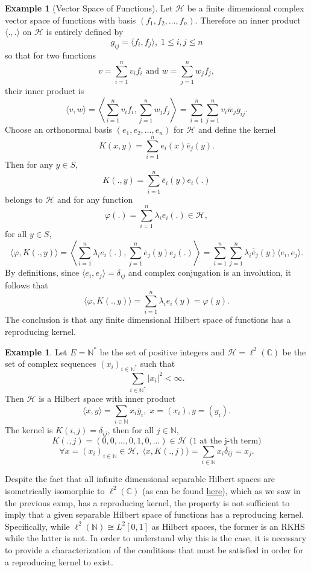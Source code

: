 \documentclass{article}
\theoremstyle{definition}
\newtheorem{exmp}[thm]{Example}
\theoremstyle{remark}
\numberwithin{equation}{section}
\begin{document}
\begin{exmp}[Vector Space of Functions]
Let $\mathcal{H}$ be a finite dimensional complex vector space of functions with basis $(f_1, f_2, \dots , f_n).$ Therefore an inner product $\langle . , . \rangle$ on $\mathcal{H}$ is entirely defined by 
$$ g_{ij} = \langle f_i, f_j \rangle, \; 1 \leq i, j \leq n$$
so that for two functions 
$$v = \sum _{i =1} ^n v_i f_i \text{ and } w = \sum ^n _{j = 1} w_j f_j, $$
their inner product is 
$$\langle v, w \rangle = \left\langle \sum _{i =1} ^n v_i f_i , \sum ^n _{j = 1} w_j f_j \right\rangle = \sum _{i = 1} ^n \sum _{j = 1} ^n v_i \overline{w}_j g_{ij}.$$
Choose an orthonormal basis $(e_1, e_2, \dots , e_n)$ for $\mathcal{H}$ and define the kernel 
$$K(x,y) = \sum _{i =1} ^n e_i (x) \overline{e} _j (y). $$
Then for any $y \in S$, 
$$K(. , y) = \sum ^n _{i = 1} \overline{e} _i (y) e_i (.)$$
belongs to $\mathcal{H}$ and for any function 
$$\varphi (.) = \sum ^n _{i = 1} \lambda _i e_i (.) \in \mathcal{H}, $$
for all $y \in S$, 
$$\langle \varphi , K(., y) \rangle = \left\langle \sum ^n _{i =1} \lambda_i e_i (.), \sum _{j=1} ^n \overline{e}_j (y) e_j (.) \right\rangle = \sum ^n _{i = 1} \sum ^n _{j = 1} \lambda _i \overline{\overline{e}}_j (y) \langle e_i, e_j \rangle.$$
By definitions, since $\langle e_i, e_j \rangle = \delta _{ij}$ and complex conjugation is an involution, it follows that 
$$\langle \varphi , K(., y) \rangle =  \sum _{i = 1} ^n \lambda _i e_i (y) = \varphi (y). $$
The conclusion is that any finite dimensional Hilbert space of functions has a reproducing kernel. 
\end{exmp}

\begin{exmp}
Let $E = \mathbb{N}^*$ be the set of positive integers and $\mathcal{H} = \ell ^2 (\mathbb{C})$ be the set of complex sequences $(x_i) _{i \in \mathbb{N}^*}$ such that 
$$\sum _{i \in \mathbb{N}^*} | x_i | ^2 < \infty. $$
Then $\mathcal{H}$ is a Hilbert space with inner product 
$$\langle x, y \rangle = \sum _{i \in \mathbb{N}} x_i \overline{y}_i, \; x = (x_i), y = (y_i). $$
The kernel is $K(i, j) = \delta_{ij}$, then for all $j \in \mathbb{N},$
$$K(., j) = (0, 0, \dots, 0, 1, 0, ...) \in \mathcal{H} \text{ (1 at the j-th term)} $$
$$\forall x = (x_i)_{i \in \mathbb{N}} \in \mathcal{H}, \; \langle x , K(., j) \rangle = \sum _{i \in \mathbb{N}} x_i \overline{\delta}_{ij} = x_j.$$
\end{exmp}

Despite the fact that all infinite dimensional separable Hilbert spaces are isometrically isomorphic to $\ell ^2 (\mathbb{C})$ (as can be found \href{http://mathonline.wikidot.com/separable-hilbert-spaces-are-isometrically-isomorphic-to-2}{here}), which as we saw in the previous exmp, has a reproducing kernel, the property is not sufficient to imply that a given separable Hilbert space of functions has a reproducing kernel. Specifically, while $\ell ^2 (\mathbb{N}) \cong L^2[0,1]$ as Hilbert spaces, the former is an RKHS while the latter is not. In order to understand why this is the case, it is necessary to provide a characterization of the conditions that must be satisfied in order for a reproducing kernel to exist. 
\end{document}
